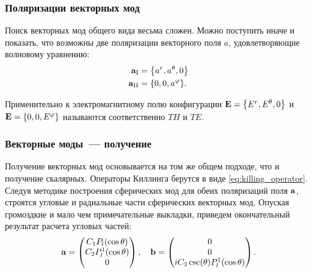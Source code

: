\documentclass{beamer}
\begin{document}

    \begin{frame}\frametitle{Поляризации векторных мод}

        Поиск векторных мод общего вида весьма сложен. Можно поступить иначе и показать, что возможны две поляризации векторного поля $a$, удовлетворяющие волновому уравнению:
        \begin{equation}\begin{aligned}
            \vb{a}_{\mathrm{I}} &= \qty{ a^r, a^\theta, 0 } \\
            \vb{a}_{\mathrm{II}} &= \qty{ 0, 0, a^\varphi } .
        \end{aligned}\end{equation}

        Применительно к электромагнитному полю конфигурации $\vb{E} = \qty{ E^r, E^\theta, 0 }$ и $\vb{E} = \qty{ 0, 0, E^\varphi }$ называются соответственно $TH$ и $TE$.

    \end{frame}


    \begin{frame}\frametitle{Векторные моды~--- получение}

        Получение векторных мод основывается на том же общем подходе, что и получение скалярных. Операторы Киллинга берутся в виде \autoref{eq:killing_operator}. Следуя методике построения сферических мод для обеих поляризаций поля $\vb{a}$, строятся угловые и радиальные части сферических векторных мод. Опуская громоздкие и мало чем примечательные выкладки, приведем окончательный результат расчета угловых частей:
        \begin{equation}
            \vb{a} = \begin{pmatrix}
                C_1 P_l(\cos\theta) \\
                C_2 P_l^1(\cos\theta) \\
                0
            \end{pmatrix} , \quad
            \vb{b} = \begin{pmatrix}
                0 \\
                0 \\
                i C_3 \csc(\theta) P_l^1(\cos\theta)
            \end{pmatrix} .
        \end{equation}

    \end{frame}
\end{document}
